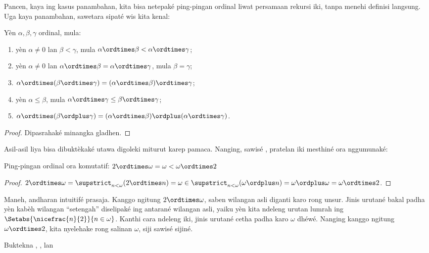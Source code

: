 \documentclass[../../../include/open-logic-section]{subfiles}
\begin{document}
Pancen, kaya ing kasus panambahan, kita bisa netepaké ping-pingan
ordinal liwat persamaan rekursi iki, tanpa menehi definisi langsung.
Uga kaya panambahan, sawetara sipaté wis kita kenal:

\begin{lem}
Yèn $\alpha, \beta, \gamma$ ordinal, mula:
\begin{enumerate}
	\item{} yèn $\alpha \neq 0$ lan $\beta < \gamma$,
	mula $\alpha \ordtimes \beta < \alpha \ordtimes \gamma$;
	\item{} yèn $\alpha \neq 0$ lan $\alpha \ordtimes
	\beta = \alpha\ordtimes\gamma$, mula $\beta = \gamma$;
	\item{} $\alpha \ordtimes (\beta \ordtimes
	\gamma) = (\alpha \ordtimes \beta) \ordtimes \gamma$;
	\item{} yèn $\alpha \leq \beta$, mula $\alpha
	\ordtimes \gamma \leq \beta \ordtimes \gamma$;
	\item{} $\alpha \ordtimes (\beta \ordplus
	\gamma) = (\alpha \ordtimes \beta )\ordplus (\alpha\ordtimes
	\gamma)$.
\end{enumerate}
\end{lem}

\begin{proof}
Dipasrahaké minangka gladhen.
\end{proof}

Asil-asil liya bisa dibuktèkaké utawa digoleki miturut
karep pamaca. Nanging, sawisé
, pratelan
iki mesthiné ora nggumunaké:

\begin{prop}
Ping-pingan ordinal ora komutatif: $2 \ordtimes \omega  =
\omega < \omega \ordtimes 2$
\end{prop}

\begin{proof}
$2 \ordtimes \omega = \supstrict_{n < \omega}(2\ordtimes  n) = \omega \in \supstrict_{n < \omega}(\omega \ordplus n) = \omega \ordplus \omega = \omega \ordtimes 2$.
\end{proof}
\noindent
Maneh, andharan intuitifé prasaja. Kanggo ngitung $2
\ordtimes \omega$, saben wilangan asli diganti karo rong unsur.
Jinis urutané bakal padha yèn kabèh wilangan “setengah” diselipaké
ing antarané wilangan asli, yaiku yèn kita ndeleng urutan lumrah ing
$\Setabs{\nicefrac{n}{2}}{n \in \omega}$. Kanthi cara ndeleng iki,
jinis urutané cetha padha karo $\omega$ dhéwé. Nanging kanggo
ngitung $\omega \ordtimes 2$, kita nyelehake rong salinan $\omega$,
siji sawisé sijiné.

\begin{prob}
Buktekna
,
,
lan
\end{prob}
\end{document}
